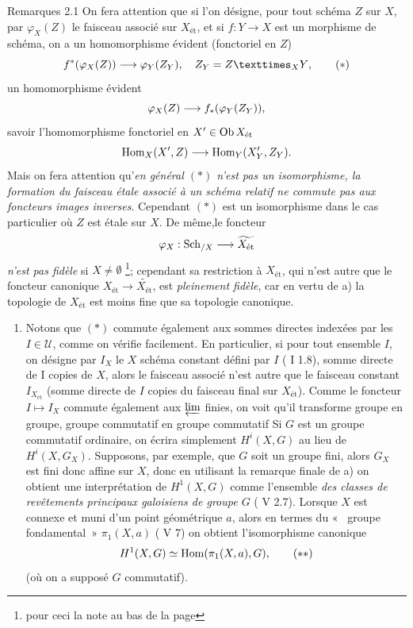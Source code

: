 \documentclass[10pt]{../fichiers-configuration-latex/smfart}
\begin{document}
\begin{enonce*}[remark]{Remarques 2.1}
On fera attention que si l'on désigne, pour tout schéma $Z$ sur $X$,
par $\varphi_{X} (Z)$ le faisceau associé sur $X_{\text{ét}}$, et si $f : Y
\to X$ est un morphisme de schéma, on a un homomorphisme évident
(fonctoriel en $Z$)
\begin{equation*}
f^{\ast} (\varphi_X (Z)) \to \varphi_Y (Z_Y),\quad Z_Y =
\fprod{Z}{Y}{X}{\quoi},\tag{$\ast$}
\end{equation*}
\ie un homomorphisme évident
$$
\varphi_X (Z) \to f_{\ast} (\varphi_Y (Z_Y)){\quoi},
$$
savoir l'homomorphisme fonctoriel en $X'\in \operatorname{Ob} X_{\text{ét}}$
$$
\Hom_X (X', Z) \to \Hom_Y (X'_{Y}, Z_{Y}){\quoi}.
$$
Mais on fera attention qu'\emph{en général $(\ast)$ n'est pas un
isomorphisme, \ie la formation du faisceau étale associé à un schéma
relatif ne commute pas aux foncteurs images inverses}. Cependant
$(\ast)$ est un isomorphisme dans le cas particulier où $Z$ est étale
sur $X$. De même,\pageoriginale le foncteur
$$
\varphi_{X} : \Sch_{/X} \to \widetilde{X_{\text{ét}}}
$$
\emph{n'est pas fidèle} si $X \neq ∅$ \footnote{\Cf pour ceci
  la note au bas de la page }; cependant sa restriction à $X_{\text{ét}}$,
qui n'est autre que le foncteur canonique
$X_{\text{ét}}\to \widetilde{X_{\text{ét}}}$, est \emph{pleinement
  fidèle}, car en vertu de a) la topologie de $X_{\text{ét}}$ est
moins fine que sa topologie canonique.

\begin{enumerate}
\renewcommand{\theenumi}{\alph{enumi}}
\renewcommand{\labelenumi}{\theenumi)}
\setcounter{enumi}{1}
\item Notons que $(\ast)$ commute également aux sommes directes
  indexées par les $I \in 𝒰$, comme on vérifie facilement. En
  particulier, si pour tout ensemble $I$, on désigne par $I_{X}$ le $X$
  schéma constant défini par $I$ ( I 1.8), somme directe de I
  copies de $X$, alors le faisceau associé n'est autre que le faisceau
  constant $I_{X_{\text{ét}}}$ (somme directe de $I$ copies du  faisceau
  final sur $X_{\text{ét}}$). Comme le foncteur $I \mapsto I_X$ commute
  également aux $\varprojlim$ finies, on voit qu'il transforme groupe
  en groupe, groupe commutatif en groupe commutatif \etc Si $G$ est
  un groupe commutatif ordinaire, on écrira simplement $H^{i}(X, G)$
  au lieu de $H^{i}(X, G_X)$. Supposons, par exemple, que $G$ soit un
  groupe fini, alors $G_X$ est fini donc affine sur $X$, donc en
  utilisant la remarque finale de a) on obtient une interprétation de
  $H^{1} (X, G)$ comme l'ensemble \emph{des classes de revêtements
  principaux galoisiens de groupe $G$} ( V 2.7). Lorsque $X$ est
  connexe et muni d'un point géométrique $a$, alors en termes du «   groupe fondamental » $\pi_1 (X, a)$ ( V 7) on obtient
  l'isomorphisme canonique
\begin{equation*}
H^1(X, G) \simeq \Hom(\pi_1(X, a), G){\quoi},\tag{${\ast}{\ast}$}
\end{equation*}
(où on a supposé $G$ commutatif).


\end{enumerate}
\end{enonce*}
\end{document}
